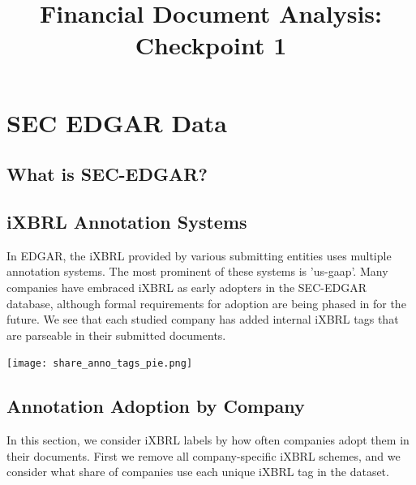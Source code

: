 \documentclass{article}
\title{Financial Document Analysis: Checkpoint 1}
\begin{document}
\maketitle


\section{SEC EDGAR Data}

\subsection{What is SEC-EDGAR?}


\subsection{iXBRL Annotation Systems}
In EDGAR, the iXBRL provided by various submitting entities uses multiple annotation systems. The most prominent of these systems is 'us-gaap'. Many companies have embraced iXBRL as early adopters in the SEC-EDGAR database, although formal requirements for adoption are being phased in for the future. We see that each studied company has added internal iXBRL tags that are parseable in their submitted documents.

\begin{center}
\texttt{[image: share\_anno\_tags\_pie.png]}
\end{center}


\subsection{Annotation Adoption by Company}
In this section, we consider iXBRL labels by how often companies adopt them in their documents. First we remove all company-specific iXBRL schemes, and we consider what share of companies use each unique iXBRL tag in the dataset.
\end{document}
